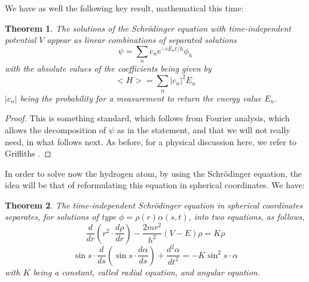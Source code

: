 \documentclass[12pt]{amsbook}
\newtheorem{theorem}{Theorem}[chapter]
\begin{document}
We have as well the following key result, mathematical this time:

\begin{theorem}
The solutions of the Schr\"odinger equation with time-independent potential $V$ appear as linear combinations of separated solutions
$$\psi=\sum_nc_ne^{-iE_nt/h}\phi_h$$
with the absolute values of the coefficients being given by
$$<H>=\sum_n|c_n|^2E_n$$
$|c_n|$ being the probability for a measurement to return the energy value $E_n$.
\end{theorem}

\begin{proof}
This is something standard, which follows from Fourier analysis, which allows the decomposition of $\psi$ as in the statement, and that we will not really need, in what follows next. As before, for a physical discussion here, we refer to Griffiths \cite{gr2}.
\end{proof}

In order to solve now the hydrogen atom, by using the Schr\"odinger equation, the idea will be that of reformulating this equation in spherical coordinates. We have:

\begin{theorem}
The time-independent Schr\"odinger equation in spherical coordinates separates, for solutions of type $\phi=\rho(r)\alpha(s,t)$, into two equations, as follows,
$$\frac{d}{dr}\left(r^2\cdot\frac{d\rho}{dr}\right)
-\frac{2mr^2}{h^2}(V-E)\rho=K\rho$$
$$\sin s\cdot\frac{d}{ds}\left(\sin s\cdot\frac{d\alpha}{ds}\right)
+\frac{d^2\alpha}{dt^2}=-K\sin^2s\cdot\alpha$$
with $K$ being a constant, called radial equation, and angular equation.
\end{theorem}
\end{document}
